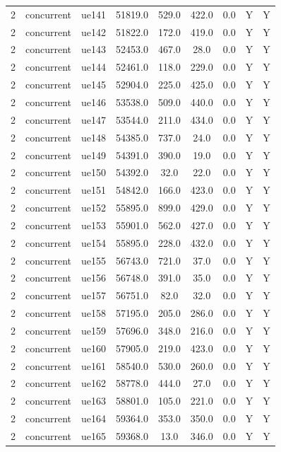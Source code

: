 \begin{table}[ht]
\begin{tabular}{|c|c|c|c|c|c|c|c|c|}
2 & concurrent & ue141 & 51819.0 & 529.0 & 422.0 & 0.0 & Y & Y \\
2 & concurrent & ue142 & 51822.0 & 172.0 & 419.0 & 0.0 & Y & Y \\
2 & concurrent & ue143 & 52453.0 & 467.0 & 28.0 & 0.0 & Y & Y \\
2 & concurrent & ue144 & 52461.0 & 118.0 & 229.0 & 0.0 & Y & Y \\
2 & concurrent & ue145 & 52904.0 & 225.0 & 425.0 & 0.0 & Y & Y \\
2 & concurrent & ue146 & 53538.0 & 509.0 & 440.0 & 0.0 & Y & Y \\
2 & concurrent & ue147 & 53544.0 & 211.0 & 434.0 & 0.0 & Y & Y \\
2 & concurrent & ue148 & 54385.0 & 737.0 & 24.0 & 0.0 & Y & Y \\
2 & concurrent & ue149 & 54391.0 & 390.0 & 19.0 & 0.0 & Y & Y \\
2 & concurrent & ue150 & 54392.0 & 32.0 & 22.0 & 0.0 & Y & Y \\
2 & concurrent & ue151 & 54842.0 & 166.0 & 423.0 & 0.0 & Y & Y \\
2 & concurrent & ue152 & 55895.0 & 899.0 & 429.0 & 0.0 & Y & Y \\
2 & concurrent & ue153 & 55901.0 & 562.0 & 427.0 & 0.0 & Y & Y \\
2 & concurrent & ue154 & 55895.0 & 228.0 & 432.0 & 0.0 & Y & Y \\
2 & concurrent & ue155 & 56743.0 & 721.0 & 37.0 & 0.0 & Y & Y \\
2 & concurrent & ue156 & 56748.0 & 391.0 & 35.0 & 0.0 & Y & Y \\
2 & concurrent & ue157 & 56751.0 & 82.0 & 32.0 & 0.0 & Y & Y \\
2 & concurrent & ue158 & 57195.0 & 205.0 & 286.0 & 0.0 & Y & Y \\
2 & concurrent & ue159 & 57696.0 & 348.0 & 216.0 & 0.0 & Y & Y \\
2 & concurrent & ue160 & 57905.0 & 219.0 & 423.0 & 0.0 & Y & Y \\
2 & concurrent & ue161 & 58540.0 & 530.0 & 260.0 & 0.0 & Y & Y \\
2 & concurrent & ue162 & 58778.0 & 444.0 & 27.0 & 0.0 & Y & Y \\
2 & concurrent & ue163 & 58801.0 & 105.0 & 221.0 & 0.0 & Y & Y \\
2 & concurrent & ue164 & 59364.0 & 353.0 & 350.0 & 0.0 & Y & Y \\
2 & concurrent & ue165 & 59368.0 & 13.0 & 346.0 & 0.0 & Y & Y \\

\end{tabular}
\end{table}
